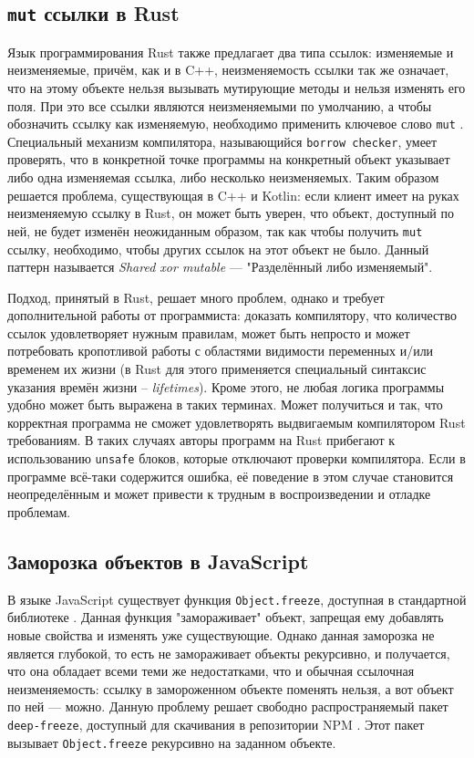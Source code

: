 \documentclass[specification,annotation,times]{itmo-student-thesis}
\begin{document}
\subsection{\texttt{mut} ссылки в Rust}

Язык программирования Rust также предлагает два типа ссылок: изменяемые и неизменяемые, причём, как и в C++, неизменяемость ссылки так же означает, что на этому объекте нельзя вызывать мутирующие методы и нельзя изменять его поля. При это все ссылки являются неизменяемыми по умолчанию, а чтобы обозначить ссылку как изменяемую, необходимо применить ключевое слово \texttt{mut} \cite{rust-mut}. 
Специальный механизм компилятора, называющийся \texttt{borrow checker}, умеет проверять, что в конкретной точке программы на конкретный объект указывает либо одна изменяемая ссылка, либо несколько неизменяемых.
Таким образом решается проблема, существующая в C++ и Kotlin: если клиент имеет на руках неизменяемую ссылку в Rust, он может быть уверен, что объект, доступный по ней, не будет изменён неожиданным образом, так как чтобы получить \texttt{mut} ссылку, необходимо, чтобы других ссылок на этот объект не было.
Данный паттерн называется \textit{Shared xor mutable} --- "Разделённый либо изменяемый".

Подход, принятый в Rust, решает много проблем, однако и требует дополнительной работы от программиста: доказать компилятору, что количество ссылок удовлетворяет нужным правилам, может быть непросто и может потребовать кропотливой работы с областями видимости переменных и/или временем их жизни (в Rust для этого применяется специальный синтаксис указания времён жизни -- \textit{lifetimes}).
Кроме этого, не любая логика программы удобно может быть выражена в таких терминах. Может получиться и так, что корректная программа не сможет удовлетворять выдвигаемым компилятором Rust требованиям.
В таких случаях авторы программ на Rust прибегают к использованию \texttt{unsafe} блоков, которые отключают проверки компилятора.
Если в программе всё-таки содержится ошибка, её поведение в этом случае становится неопределённым и может привести к трудным в воспроизведении и отладке проблемам.

\subsection{Заморозка объектов в JavaScript}\label{js_freeze}

В языке JavaScript существует функция \texttt{Object.freeze}, доступная в стандартной библиотеке \cite{EcmaScript}. Данная функция "замораживает" объект, запрещая ему добавлять новые свойства и изменять уже существующие.
Однако данная заморозка не является глубокой, то есть не замораживает объекты рекурсивно, и получается, что она обладает всеми теми же недостатками, что и обычная ссылочная неизменяемость: ссылку в замороженном объекте поменять нельзя, а вот объект по ней --- можно.
Данную проблему решает свободно распространяемый пакет \texttt{deep-freeze}, доступный для скачивания в репозитории NPM \cite{js-deep-freeze}. Этот пакет вызывает \texttt{Object.freeze} рекурсивно на заданном объекте.
\end{document}
